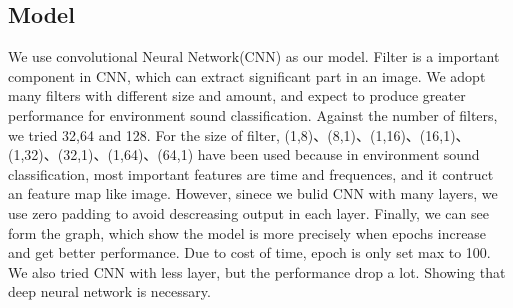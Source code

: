 \subsection{Model}
We use convolutional Neural Network(CNN) as our model. Filter is a important component in CNN, which can extract 
significant part in an image. We adopt many filters with different size and amount, and expect to produce greater 
performance for environment sound classification. Against the number of filters, we tried 32,64 and 128. For the size of filter,
(1,8)、(8,1)、(1,16)、(16,1)、(1,32)、(32,1)、(1,64)、(64,1) have been used because in environment sound classification, most important features
are time and frequences, and it contruct an feature map like image. 
However, sinece we bulid CNN with many layers, we use zero padding to avoid descreasing output in each layer. Finally, we can see form the graph,
which show the model is more precisely when epochs increase and get better performance. Due to cost of time, epoch is only set max to 100.
We also tried CNN with less layer, but the performance drop a lot. Showing that deep neural network is necessary. 